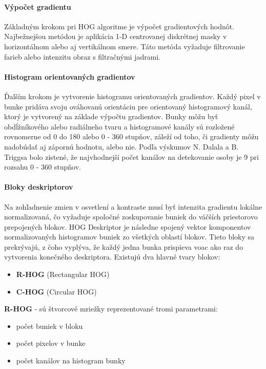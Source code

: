 \paragraph{Výpočet gradientu}

Základným krokom pri HOG algoritme je výpočet gradientových hodnôt. Najbežnejšou metódou je aplikácia 1-D centrovanej diskrétnej masky v horizontálnom alebo aj vertikálnom smere. Táto metóda vyžaduje filtrovanie farieb alebo intenzitu obraz s filtračnými jadrami.

\paragraph{Histogram orientovaných gradientov}
Ďalším krokom je vytvorenie histogramu orientovaných gradientov. Každý pixel v bunke pridáva svoju ováhovanú orientáciu pre orientovaný histogramový kanál, ktorý je vytvorený na základe výpočtu gradientov. Bunky môžu byť obdĺžníkového alebo radiálneho tvaru a histogramové kanály sú rozložené rovnomerne od 0 do 180 alebo 0 - 360 stupňov, záleží od toho, či gradienty môžu nadobúdať aj zápornú hodnotu, alebo nie. Podľa výskumov  N. Dalala a B. Triggsa bolo zistené, že najvhodnejší počet kanálov na detekovanie osoby je 9 pri rozsahu 0 - 360 stupňov.

\paragraph{Bloky deskriptorov}
Na zohľadnenie zmien v osvetlení a kontraste musí byť intenzita gradientu lokálne normalizovaná, čo vyžaduje spoločné zoskupovanie buniek do väčších priestorovo prepojených blokov. HOG Deskriptor je následne spojený vektor komponentov normalizovaných histogramov buniek zo všetkých oblastí blokov. Tieto bloky sa prekrývajú, z čoho vyplýva, že každý jedna bunka prispieva voac ako raz do vytvorenia konečného deskriptora. Existujú dva hlavné tvary blokov:

\begin{itemize}
\item \textbf{R-HOG} (Rectangular HOG)
\item \textbf{C-HOG} (Circular HOG)
\end{itemize}


\textbf{R-HOG} - sú štvorcové mriežky reprezentované tromi parametrami:
\begin{itemize}
\item počet buniek v bloku
\item počet pixelov v bunke
\item počet kanálov na histogram bunky
\end{itemize}

